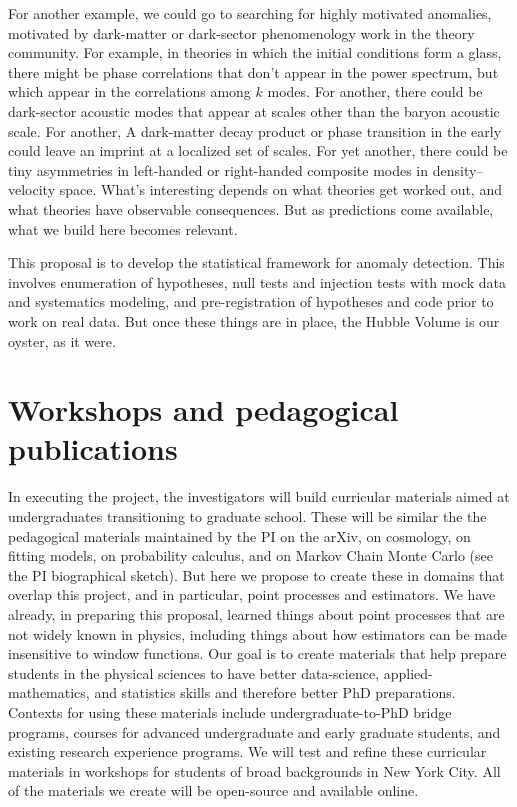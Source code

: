 \documentclass[12pt, fullpage, letterpaper]{article}
\begin{document}
For another example, we could go to searching for highly motivated anomalies, motivated by dark-matter or dark-sector phenomenology work in the theory community.
For example, in theories in which the initial conditions form a glass, there might be phase correlations that don't appear in the power spectrum, but which appear in the correlations among $k$ modes.
For another, there could be dark-sector acoustic modes that appear at scales other than the baryon acoustic scale.
For another, A dark-matter decay product or phase transition in the early could leave an imprint at a localized set of scales.
For yet another, there could be tiny asymmetries in left-handed or right-handed composite modes in density--velocity space.
What's interesting depends on what theories get worked out, and what theories have observable consequences.
But as predictions come available, what we build here becomes relevant.

This proposal is to develop the statistical framework for anomaly detection.
This involves enumeration of hypotheses,
null tests and injection tests with mock data and systematics modeling,
and pre-registration of hypotheses and code prior to work on real data.
But once these things are in place, the Hubble Volume is our oyster, as it were.

\section{Workshops and pedagogical publications}

In executing the project, the investigators will build curricular
materials aimed at undergraduates transitioning to graduate school.
These will be similar the the pedagogical materials maintained by
the PI on the arXiv, on cosmology, on fitting models, on probability
calculus, and on Markov Chain Monte Carlo (see the PI biographical sketch).
But here we propose to create these in domains that
overlap this project, and in particular, point processes and estimators.
We have already, in preparing this proposal, learned things about
point processes that are not widely known in physics, including things about
how estimators can be made insensitive to window functions.
Our goal is to create materials that help prepare students
in the physical sciences to have better data-science, applied-mathematics, and statistics
skills and therefore better PhD preparations.
Contexts for using these materials include undergraduate-to-PhD bridge programs, courses for advanced undergraduate and early graduate students, and existing research experience programs. 
We will test and refine these curricular materials in workshops for
students of broad backgrounds in New York City.
All of the materials we create will be open-source and available online. 
\end{document}
